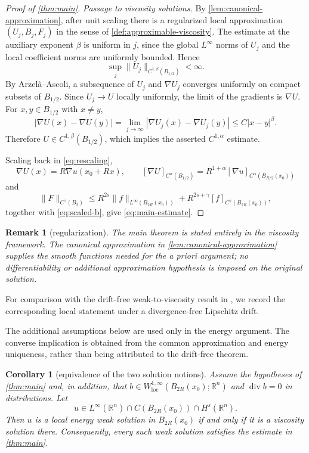 \documentclass[10pt,a4paper]{amsart}
\numberwithin{equation}{section}
\newtheorem{corollary}[theorem]{Corollary}
\newtheorem{remark}[theorem]{Remark}
\newcommand{\R}{\mathbb R}
\DeclareMathOperator{\divergence}{div}
\newcommand{\rev}[1]{#1}
\begin{document}
\begin{proof}[Proof of \cref{thm:main}]
\smallskip
\noindent\emph{Passage to viscosity solutions.}
\rev{By \cref{lem:canonical-approximation}, after unit scaling there is a
regularized local approximation $(U_j,B_j,F_j)$ in the sense of
\cref{def:approximable-viscosity}.  The estimate at the auxiliary exponent
$\beta$ is uniform in $j$, since the global $L^\infty$ norms of $U_j$ and
the local coefficient norms are uniformly bounded.  Hence
\[
 \sup_j\|U_j\|_{C^{1,\beta}(B_{1/2})}<\infty.
\]
By Arzel\`a--Ascoli, a subsequence of $U_j$ and $\nabla U_j$ converges
uniformly on compact subsets of $B_{1/2}$.  Since $U_j\to U$ locally
uniformly, the limit of the gradients is $\nabla U$.  For
$x,y\in B_{1/2}$ with $x\ne y$,
\[
 |\nabla U(x)-\nabla U(y)|
 =\lim_{j\to\infty}|\nabla U_j(x)-\nabla U_j(y)|
 \le C|x-y|^\beta.
\]
Therefore $U\in C^{1,\beta}(B_{1/2})$, which implies the asserted
$C^{1,\alpha}$ estimate.}

\rev{Scaling back in \eqref{eq:rescaling},
\[
 \nabla U(x)=R\nabla u(x_0+Rx),\qquad
 [\nabla U]_{C^\alpha(B_{1/2})}
 =R^{1+\alpha}[\nabla u]_{C^\alpha(B_{R/2}(x_0))}
\]
and
\[
 \|F\|_{C^\gamma(B_2)}
 \le R^{2s}\|f\|_{L^\infty(B_{2R}(x_0))}
 +R^{2s+\gamma}[f]_{C^\gamma(B_{2R}(x_0))},
\]
together with \eqref{eq:scaled-b}, give \eqref{eq:main-estimate}.}
\end{proof}

\begin{remark}[regularization]
The main theorem is stated entirely in the viscosity framework.  The
canonical approximation in \cref{lem:canonical-approximation} supplies the
smooth functions needed for the a priori argument; no differentiability or
additional approximation hypothesis is imposed on the original solution.
\end{remark}

For comparison with the drift-free weak-to-viscosity result in
\cite[Theorem~1]{ServadeiValdinoci2014}, we record the corresponding local statement
under a divergence-free Lipschitz drift.

\rev{The additional assumptions below are used only in the energy
argument.  The converse implication is obtained from the common
approximation and energy uniqueness, rather than being attributed to the
drift-free theorem.}

\begin{corollary}[equivalence of the two solution notions]
\label{cor:weak-viscosity-equivalence}
Assume the hypotheses of \cref{thm:main} and, in addition, that
$b\in W^{1,\infty}_{\mathrm{loc}}(B_{2R}(x_0);\R^n)$ and
$\divergence b=0$ in distributions.  Let
\[
 u\in L^\infty(\R^n)\cap C(B_{2R}(x_0))
       \cap \rev{H^s(\R^n)}.
\]
Then $u$ is a local energy weak solution in $B_{2R}(x_0)$ if and only if
it is a viscosity solution there.  Consequently, every such weak solution
satisfies the estimate in \cref{thm:main}.
\end{corollary}
\end{document}
